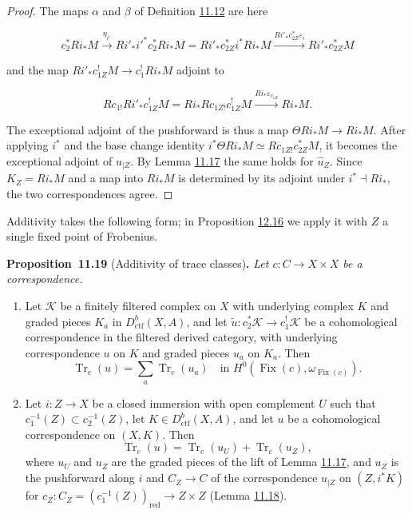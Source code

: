 \documentclass[11pt]{article}
\newenvironment{bpstatement}[2]{\par\addvspace{0.6\baselineskip}\noindent\textbf{#1}#2\textbf{.}\enspace\ignorespaces}
  {\par\addvspace{0.4\baselineskip}}
\newenvironment{bpstatementit}[2]{\begin{bpstatement}{#1}{#2}\itshape\ignorespaces}{\end{bpstatement}}
\providecommand{\Fix}{}\renewcommand{\Fix}{\operatorname{Fix}}
\begin{document}
\begin{proof}[{Proof}]\label{bp221}%
The maps \(\alpha\) and \(\beta\) of Definition \hyperref[bp204]{11.12} are here

\[
c_2^*Ri_*M\xrightarrow{\eta_{i'}}
Ri'_*i'^*c_2^*Ri_*M
=Ri'_*c_{2Z}^*i^*Ri_*M
\xrightarrow{Ri'_*c_{2Z}^*\varepsilon_i}Ri'_*c_{2Z}^*M
\]

and the map \(Ri'_*c_{1Z}^!M\to c_1^!Ri_*M\) adjoint to

\[
Rc_{1!}Ri'_*c_{1Z}^!M
=Ri_*Rc_{1Z!}c_{1Z}^!M\xrightarrow{Ri_*\varepsilon_{c_{1Z}}}Ri_*M.
\]

The exceptional adjoint of the pushforward is thus a map \(\Theta Ri_*M\to Ri_*M\). After applying \(i^*\) and the base change identity \(i^*\Theta Ri_*M\simeq Rc_{1Z!}c_{2Z}^*M\), it becomes the exceptional adjoint of \(u_{|Z}\). By Lemma \hyperref[bp217]{11.17} the same holds for \(\widehat u_Z\). Since \(K_Z=Ri_*M\) and a map into \(Ri_*M\) is determined by its adjoint under \(i^*\dashv Ri_*\), the two correspondences agree.
\end{proof}

\label{bp222}%
Additivity takes the following form; in Proposition \hyperref[bp274]{12.16} we apply it with \(Z\) a single fixed point of Frobenius.

\label{bp223}%
\begin{bpstatementit}{Proposition~11.19}{ (Additivity of trace classes)}
Let \(c:C\to X\times X\) be a correspondence.

\begin{enumerate}
\item Let \(\mathcal K\) be a finitely filtered complex on \(X\) with underlying complex \(K\) and graded pieces \(K_a\) in \(D^b_{\mathrm{ctf}}(X,A)\), and let \(\tilde u:c_2^*\mathcal K\to c_1^!\mathcal K\) be a cohomological correspondence in the filtered derived category, with underlying correspondence \(u\) on \(K\) and graded pieces \(u_a\) on \(K_a\). Then \[
   \operatorname{Tr}_c(u)=\sum_a\operatorname{Tr}_c(u_a)
   \quad\text{in }H^0(\Fix(c),\omega_{\Fix(c)}).
   \]
\item Let \(i:Z\to X\) be a closed immersion with open complement \(U\) such that \(c_1^{-1}(Z)\subset c_2^{-1}(Z)\), let \(K\in D^b_{\mathrm{ctf}}(X,A)\), and let \(u\) be a cohomological correspondence on \((X,K)\). Then \[
   \operatorname{Tr}_c(u)=\operatorname{Tr}_c(u_U)+\operatorname{Tr}_c(u_Z),
   \] where \(u_U\) and \(u_Z\) are the graded pieces of the lift of Lemma \hyperref[bp217]{11.17}, and \(u_Z\) is the pushforward along \(i\) and \(C_Z\to C\) of the correspondence \(u_{|Z}\) on \((Z,i^*K)\) for \(c_Z:C_Z=(c_1^{-1}(Z))_{\mathrm{red}}\to
Z\times Z\) (Lemma \hyperref[bp220]{11.18}).
\end{enumerate}
\end{bpstatementit}
\end{document}
